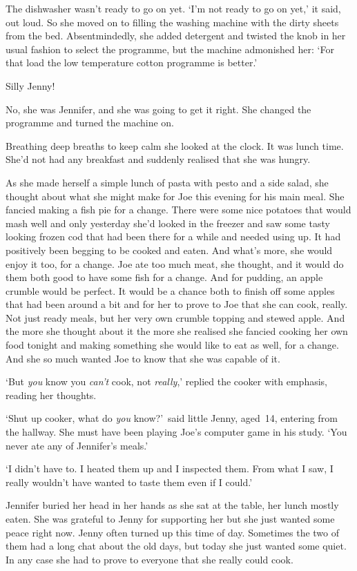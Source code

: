 The dishwasher wasn't ready to go on yet. `I'm not ready to go on 
yet,' it said, out loud. So she moved on to filling the washing 
machine with the dirty sheets from the bed. Absentmindedly, she 
added detergent and twisted the knob in her usual fashion to select 
the programme, but the machine admonished her: `For that load the 
low temperature cotton programme is better.'

Silly Jenny!

No, she was Jennifer, and she was going to get it right. She 
changed the programme and turned the machine on.

Breathing deep breaths to keep calm she looked at the clock. It 
was lunch time. She'd not had any breakfast and suddenly realised 
that she was hungry.

As she made herself a simple lunch of pasta with pesto and a side 
salad, she thought about what she might make for Joe this evening 
for his main meal. She fancied making a fish pie for a change. 
There were some nice potatoes that would mash well and only 
yesterday she'd looked in the freezer and saw some tasty looking 
frozen cod that had been there for a while and needed using up. It 
had positively been begging to be cooked and eaten. And what's 
more, she would enjoy it too, for a change. Joe ate too much meat, 
she thought, and it would do them both good to have some fish for a 
change. And for pudding, an apple crumble would be perfect. It 
would be a chance both to finish off some apples that had been 
around a bit and for her to prove to Joe that she can cook, really. 
Not just ready meals, but her very own crumble topping and stewed 
apple. And the more she thought about it the more she realised she 
fancied cooking her own food tonight and making something she would 
like to eat as well, for a change. And she so much wanted Joe to know that she 
was capable of it.

`But \textit{you} know you \textit{can't} cook, not \textit{really},' replied the 
cooker with emphasis, reading her thoughts.

`Shut up cooker, what do \textit{you} know?'~said little Jenny, 
aged~14, entering from the hallway. She must have been playing 
Joe's computer game in his study. `You never ate any of Jennifer's 
meals.'

`I didn't have to. I heated them up and I inspected them. From 
what I saw, I really wouldn't have wanted to taste them even if I 
could.'

Jennifer buried her head in her hands as she sat at the table, her 
lunch mostly eaten. She was grateful to Jenny for supporting her 
but she just wanted some peace right now. Jenny often turned up 
this time of day. Sometimes the two of them had a long chat about 
the old days, but today she just wanted some quiet. In any case 
she had to prove to everyone that she really could cook.

